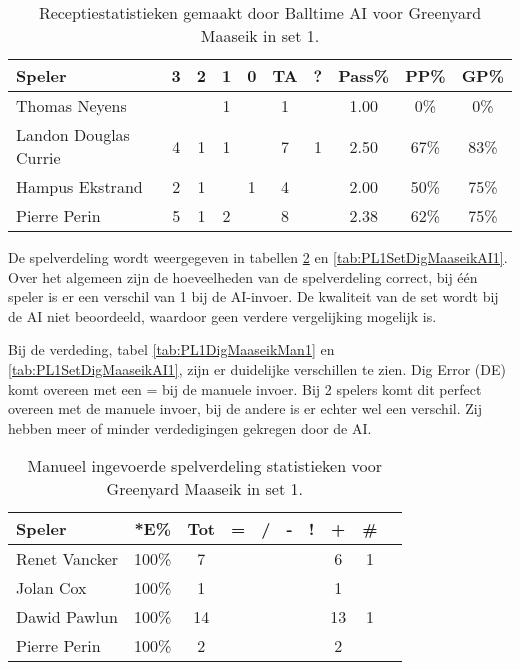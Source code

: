 \begin{table}[ht!]
  \centering
  \scriptsize
  \begin{tabular}{|l|c|c|c|c|c|c|c|c|c|} \hline
    \textbf{Speler} & 3 & 2 & 1 & 0 & TA & ? & Pass\% & PP\% & GP\% \\ \hline
    Thomas Neyens &  &  & 1 &  & 1 &  & 1.00 & 0\% & 0\%  \\
    Landon Douglas Currie & 4 & 1 & 1 &  & 7 & 1 & 2.50 & 67\% & 83\% \\
    Hampus Ekstrand & 2 & 1 &  & 1 & 4 &  & 2.00 & 50\% & 75\% \\
    Pierre Perin & 5 & 1 & 2 &  & 8 &  & 2.38 & 62\% & 75\% \\ \hline
  \end{tabular}
  \caption[Receptiestatistieken gemaakt door Balltime AI voor Greenyard Maaseik in set 1]{\label{tab:PL1ReceiveMaaseikAI1}Receptiestatistieken gemaakt door Balltime AI voor Greenyard Maaseik in set 1.}
\end{table}

De spelverdeling wordt weergegeven in tabellen \ref{tab:PL1SetMaaseikMan1} en \ref{tab:PL1SetDigMaaseikAI1}. Over het algemeen zijn de hoeveelheden van de spelverdeling correct, bij één speler is er een verschil van 1 bij de AI-invoer. De kwaliteit van de set wordt bij de AI niet beoordeeld, waardoor geen verdere vergelijking mogelijk is.

Bij de verdeding, tabel \ref{tab:PL1DigMaaseikMan1} en \ref{tab:PL1SetDigMaaseikAI1}, zijn er duidelijke verschillen te zien. Dig Error (DE) komt overeen met een = bij de manuele invoer. Bij 2 spelers komt dit perfect overeen met de manuele invoer, bij de andere is er echter wel een verschil.  Zij hebben meer of minder verdedigingen gekregen door de AI.

\begin{table}[ht!]
    \centering
    \scriptsize
    \begin{tabular}{|l|c|c|c|c|c|c|c|c|c|} \hline
        \textbf{Speler}& *E\% & Tot & = & / & - & ! & + & \# \\ \hline
        Renet Vancker  & 100\% & 7 &  &  &  &  & 6 & 1  \\
        Jolan Cox  & 100\% & 1 &  &  &  &  & 1 &  \\ 
        Dawid Pawlun  & 100\% & 14 &  &  &  &  & 13 & 1  \\ 
        Pierre Perin & 100\% & 2 &  &  &  &  & 2 & \\ \hline
    \end{tabular}
    \caption[Manueel ingevoerde spelverdelingsstatistieken voor Greenyard Maaseik in set 1]{\label{tab:PL1SetMaaseikMan1}Manueel ingevoerde spelverdeling statistieken voor Greenyard Maaseik in set 1.}
\end{table}

